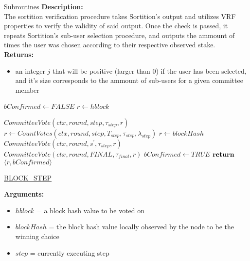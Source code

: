 \documentclass[10pt,a4paper]{article}
\begin{document}
\begin{section}{Subroutines}
\noindent \textbf{Description:}\\
The sortition verification procedure takes Sortition's output and utilizes VRF properties to verify the validity of said output.
Once the check is passed, it repeats Sortition's sub-user selection procedure, and outputs the ammount of times the user was chosen
according to their respective observed stake.\\

\noindent \textbf{Returns:}
\begin{itemize}
    \item an integer $j$ that will be positive (larger than 0) if the user has been selected, and it's size corresponds to the ammount
    of sub-users for a given committee member
  \end{itemize}


\begin{algorithm}[H]
    \begin{algorithmic}[H]
        \State $bConfirmed \gets FALSE$
        \State $r \gets hblock$

        \State $CommitteeVote(ctx, round, step, \tau_{step}, r)$
        \State $r \gets CountVotes(ctx,round,step,T_{step},\tau_{step},\lambda_{step})$
            \State $r \gets blockHash$
                \State $CommitteeVote(ctx, round, s^\prime, \tau_{step}, r)$
            \EndFor
                \State $CommitteeVote(ctx, round, FINAL, \tau_{final}, r)$
            \EndIf
            \State $bConfirmed \gets TRUE$
        \EndIf
        $\Return$ $ \langle r, bConfirmed \rangle$
    \EndFunction
    \end{algorithmic}
    \caption{\underline{BLOCK\_STEP}}
\end{algorithm}

\noindent \textbf{Arguments:}
\begin{itemize}
    \item $hblock$ = a block hash value to be voted on
    \item $blockHash$ = the block hash value locally observed by the node to be the winning choice
    \item $step$ = currently executing step
  \end{itemize}


\end{section}
\end{document}
